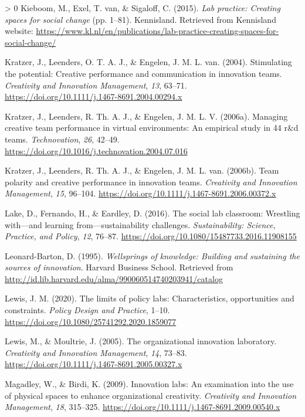 \documentclass[]{elsarticle} %
\newlength{\cslhangindent}
\newenvironment{CSLReferences}[3] %
 {%
  \setlength{\parindent}{0pt}
  \ifodd #1 \everypar{\setlength{\hangindent}{\cslhangindent}}\ignorespaces\fi
  \ifnum #2 > 0
  \setlength{\parskip}{#2\baselineskip}
  \fi
 }%
 {}
\begin{document}
\begin{CSLReferences}{1}{0}
\leavevmode\hypertarget{ref-Kieboom2015}{}%
Kieboom, M., Exel, T. van, \& Sigaloff, C. (2015). \emph{Lab practice:
Creating spaces for social change} (pp. 1--81). Kennisland. Retrieved
from Kennisland website:
\url{https://www.kl.nl/en/publications/lab-practice-creating-spaces-for-social-change/}

\leavevmode\hypertarget{ref-Kratzer2004}{}%
Kratzer, J., Leenders, O. T. A. J., \& Engelen, J. M. L. van. (2004).
Stimulating the potential: Creative performance and communication in
innovation teams. \emph{Creativity and Innovation Management},
\emph{13}, 63--71.
\url{https://doi.org/10.1111/j.1467-8691.2004.00294.x}

\leavevmode\hypertarget{ref-Kratzer2006-A}{}%
Kratzer, J., Leenders, R. Th. A. J., \& Engelen, J. M. L. V. (2006a).
Managing creative team performance in virtual environments: An empirical
study in 44 r\&d teams. \emph{Technovation}, \emph{26}, 42--49.
\url{https://doi.org/10.1016/j.technovation.2004.07.016}

\leavevmode\hypertarget{ref-Kratzer2006-B}{}%
Kratzer, J., Leenders, R. Th. A. J., \& Engelen, J. M. L. van. (2006b).
Team polarity and creative performance in innovation teams.
\emph{Creativity and Innovation Management}, \emph{15}, 96--104.
\url{https://doi.org/10.1111/j.1467-8691.2006.00372.x}

\leavevmode\hypertarget{ref-Lake2016}{}%
Lake, D., Fernando, H., \& Eardley, D. (2016). The social lab classroom:
Wrestling with---and learning from---sustainability challenges.
\emph{Sustainability: Science, Practice, and Policy}, \emph{12}, 76--87.
\url{https://doi.org/10.1080/15487733.2016.11908155}

\leavevmode\hypertarget{ref-Leonard1995}{}%
Leonard-Barton, D. (1995). \emph{Wellsprings of knowledge: Building and
sustaining the sources of innovation}. Harvard Business School.
Retrieved from
\url{http://id.lib.harvard.edu/alma/990060514740203941/catalog}

\leavevmode\hypertarget{ref-Lewis2020}{}%
Lewis, J. M. (2020). The limits of policy labs: Characteristics,
opportunities and constraints. \emph{Policy Design and Practice}, 1--10.
\url{https://doi.org/10.1080/25741292.2020.1859077}

\leavevmode\hypertarget{ref-Lewis2005}{}%
Lewis, M., \& Moultrie, J. (2005). The organizational innovation
laboratory. \emph{Creativity and Innovation Management}, \emph{14},
73--83. \url{https://doi.org/10.1111/j.1467-8691.2005.00327.x}

\leavevmode\hypertarget{ref-Magadley2009}{}%
Magadley, W., \& Birdi, K. (2009). Innovation labs: An examination into
the use of physical spaces to enhance organizational creativity.
\emph{Creativity and Innovation Management}, \emph{18}, 315--325.
\url{https://doi.org/10.1111/j.1467-8691.2009.00540.x}


\end{CSLReferences}
\end{document}
